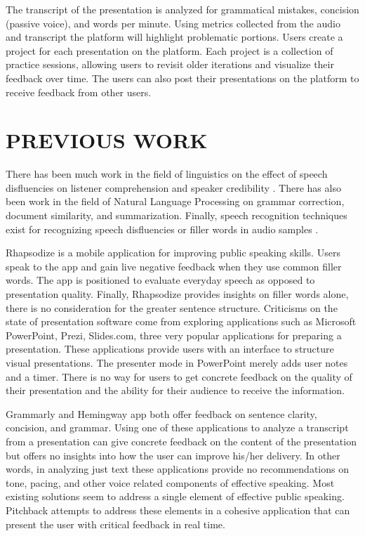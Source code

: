 The transcript of the presentation is analyzed for
grammatical mistakes, concision (passive voice), and words per minute. Using
metrics collected from the audio and transcript the platform will highlight
problematic portions. Users create a project for each presentation on the
platform. Each project is a collection of practice sessions, allowing users to
revisit older iterations and visualize their feedback over time. The users can
also post their presentations on the platform to receive feedback from other
users.


\section*{PREVIOUS WORK} 


There has been much work in the field of linguistics on the effect of speech
disfluencies on listener comprehension and speaker credibility \citep{duvallaimee}. There has
also been work in the field of Natural Language Processing on grammar
correction, document similarity, and summarization. Finally, speech recognition
techniques exist for recognizing speech disfluencies or filler words in audio
samples \citep{leasejohnson} \citep{kumar}.

Rhapsodize \citep{tarkyoon} is a mobile application for improving public speaking skills.
Users speak to the app and gain live negative feedback when they use common
filler words. The app is positioned to evaluate everyday speech as opposed to
presentation quality. Finally, Rhapsodize provides insights on filler words
alone, there is no consideration for the greater sentence structure.  Criticisms
on the state of presentation software come from exploring applications such as
Microsoft PowerPoint, Prezi, Slides.com, three very popular applications for
preparing a presentation. These applications provide users with an interface to
structure visual presentations. The presenter mode in PowerPoint merely adds
user notes and a timer. There is no way for users to get concrete feedback on
the quality of their presentation and the ability for their audience to receive
the information.

Grammarly \citep{grammarly} and Hemingway \citep{hemingway} app both offer
feedback on sentence clarity, concision, and grammar. Using one of these
applications to analyze a transcript from a presentation can give concrete
feedback on the content of the presentation but offers no insights into how the
user can improve his/her delivery. In other words, in analyzing just text these
applications provide no recommendations on tone, pacing, and other voice related
components of effective speaking.  Most existing solutions seem to address a
single element of effective public speaking. Pitchback attempts to address these
elements in a cohesive application that can present the user with critical
feedback in real time.

